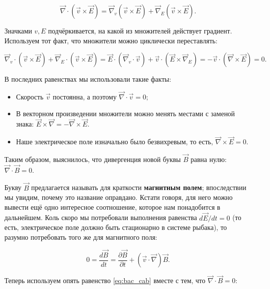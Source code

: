 \documentclass[a4paper,12pt]{article}
\numberwithin{equation}{section}
\newcommand{\pt}{\partial}
\newcommand{\vn}{\vec{\nabla}}
\begin{document}
\begin{equation}
  \label{eq:nabla_eq_1}
  \vn \cdot \left( \vec{v} \times \vec{E} \right) = \vn_v \left(
    \vec{v} \times \vec{E} \right)  + \vn_E \left( \vec{v} \times \vec{E} \right).
\end{equation}

Значками $v,E$ подчёркивается, на какой из множителей действует
градиент. Используем тот факт, что множители можно циклически
переставлять: 

\begin{equation}
  \label{eq:nabla_eq_2}
  \vn_v \cdot \left(
    \vec{v} \times \vec{E} \right)  + \vn_E \cdot \left( \vec{v} \times
    \vec{E} \right) = \vec{E} \cdot \left( \vn_v \cdot \vec{v} \right) +
  \vec{v} \cdot \left( \vec{E} \times \vn_E \right) = -\vec{v} \cdot
  \left( \vn \times \vec{E} \right) =0.
\end{equation}

В последних равенствах мы использовали такие факты: 

\begin{itemize}
\item Скорость $\vec{v}$ постоянна, а поэтому $\vn \cdot \vec{v} =0$;
\item В векторном произведении множители можно менять местами с
  заменой знака: $\vec{E} \times \vn = - \vn \times \vec{E}$.
\item Наше электрическое поле изначально было безвихревым, то есть,
  $\vn \times \vec{E}=0$.
\end{itemize}

Таким образом, выяснилось, что дивергенция новой буквы $\vec{B}$ равна
нулю: $\vn \cdot \vec{B}=0$.

Букву $\vec{B}$ предлагается называть для краткости \textbf{магнитным
  полем}; впоследствии мы увидим, почему это название
оправдано. Кстати говоря, для него можно вывести ещё одно интересное
соотношение, которое нам понадобится в дальнейшем. Коль скоро мы
потребовали выполнения равенства $d\vec{E}/dt=0$ (то есть, электрическое
поле должно быть стационарно в системе рыбака), то разумно потребовать
того же для магнитного поля:

\begin{equation}
  \label{eq:db/dt_1}
  0=\frac{d\vec{B}}{dt} = \frac{\pt \vec{B}}{\pt t} + \left( \vec{v}
    \cdot \vn \right) \vec{B}.
\end{equation}

Теперь используем опять равенство \eqref{eq:bac_cab} вместе с тем, что
$\vn \cdot \vec{B}=0$: 
\end{document}

